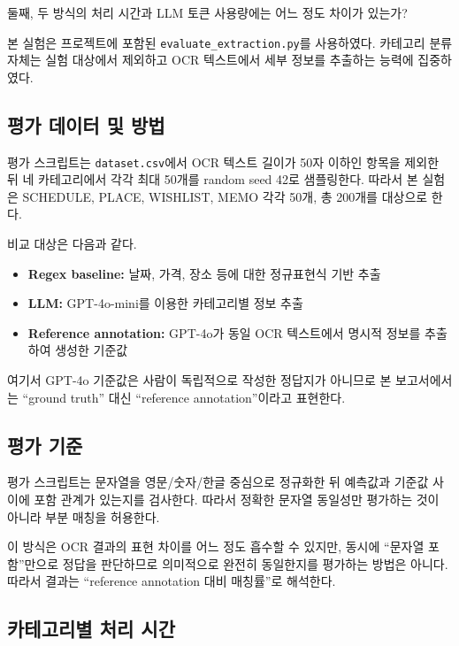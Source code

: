 \documentclass[11pt,a4paper]{article}
\begin{document}
둘째, 두 방식의 처리 시간과 LLM 토큰 사용량에는 어느 정도 차이가 있는가?

본 실험은 프로젝트에 포함된 \texttt{evaluate\_extraction.py}를 사용하였다. 카테고리 분류 자체는 실험 대상에서 제외하고 OCR 텍스트에서 세부 정보를 추출하는 능력에 집중하였다.

\subsection{평가 데이터 및 방법}

평가 스크립트는 \texttt{dataset.csv}에서 OCR 텍스트 길이가 50자 이하인 항목을 제외한 뒤 네 카테고리에서 각각 최대 50개를 random seed 42로 샘플링한다. 따라서 본 실험은 SCHEDULE, PLACE, WISHLIST, MEMO 각각 50개, 총 200개를 대상으로 한다.

비교 대상은 다음과 같다.

\begin{itemize}
    \item \textbf{Regex baseline:} 날짜, 가격, 장소 등에 대한 정규표현식 기반 추출
    \item \textbf{LLM:} GPT-4o-mini를 이용한 카테고리별 정보 추출
    \item \textbf{Reference annotation:} GPT-4o가 동일 OCR 텍스트에서 명시적 정보를 추출하여 생성한 기준값
\end{itemize}

여기서 GPT-4o 기준값은 사람이 독립적으로 작성한 정답지가 아니므로 본 보고서에서는 ``ground truth'' 대신 ``reference annotation''이라고 표현한다.

\subsection{평가 기준}

평가 스크립트는 문자열을 영문/숫자/한글 중심으로 정규화한 뒤 예측값과 기준값 사이에 포함 관계가 있는지를 검사한다. 따라서 정확한 문자열 동일성만 평가하는 것이 아니라 부분 매칭을 허용한다.

이 방식은 OCR 결과의 표현 차이를 어느 정도 흡수할 수 있지만, 동시에 ``문자열 포함''만으로 정답을 판단하므로 의미적으로 완전히 동일한지를 평가하는 방법은 아니다. 따라서 결과는 ``reference annotation 대비 매칭률''로 해석한다.

\subsection{카테고리별 처리 시간}
\end{document}
